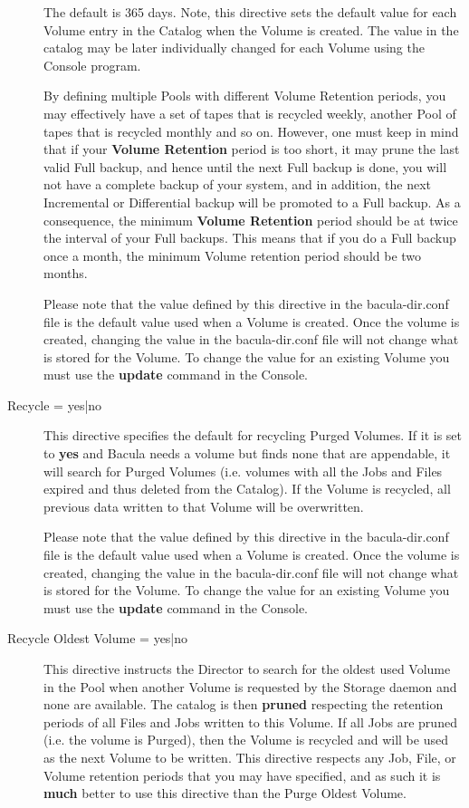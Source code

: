 \begin{description}
The default is 365 days. Note, this directive sets the default  value for each
Volume entry in the Catalog when the Volume is  created. The value in the 
catalog may be later individually changed for each Volume using  the Console
program.  

By defining multiple Pools with different Volume Retention periods,  you may
effectively have a set of tapes that is recycled weekly,  another Pool of
tapes that is recycled monthly and so on. However,  one must keep in mind that
if your {\bf Volume Retention} period  is too short, it may prune the last
valid Full backup, and hence  until the next Full backup is done, you will not
have a complete  backup of your system, and in addition, the next Incremental 
or Differential backup will be promoted to a Full backup. As  a consequence,
the minimum {\bf Volume Retention} period should be at  twice the interval of
your Full backups. This means that if you  do a Full backup once a month, the
minimum Volume retention  period should be two months.  

Please note that the value defined by this directive in the  bacula-dir.conf
file is the default value used when a Volume  is created. Once the volume is
created, changing the value  in the bacula-dir.conf file will not change what
is stored  for the Volume. To change the value for an existing Volume  you
must use the {\bf update} command in the Console.  
\label{PoolRecycle}

\item [Recycle = \lt{}yes|no\gt{}]
   This directive specifies the  default for recycling Purged Volumes. If it is
set to {\bf yes}  and Bacula needs a volume but finds none that are 
appendable, it will search for Purged Volumes (i.e. volumes  with all the Jobs
and Files expired and thus deleted from  the Catalog). If the Volume is
recycled, all previous data  written to that Volume will be overwritten.  

Please note that the value defined by this directive in the  bacula-dir.conf
file is the default value used when a Volume  is created. Once the volume is
created, changing the value  in the bacula-dir.conf file will not change what
is stored  for the Volume. To change the value for an existing Volume  you
must use the {\bf update} command in the Console.  
\label{RecycleOldest}

\item [Recycle Oldest Volume = \lt{}yes|no\gt{}]
   This directive instructs the Director to search for the oldest used Volume
in the Pool when another Volume is requested by the Storage daemon and none
are available.  The catalog is then {\bf pruned} respecting the retention
periods of all Files and Jobs written to this Volume.  If all Jobs are
pruned (i.e.  the volume is Purged), then the Volume is recycled and will
be used as the next Volume to be written.  This directive respects any Job,
File, or Volume retention periods that you may have specified, and as such
it is {\bf much} better to use this directive than the Purge Oldest Volume.


\end{description}
